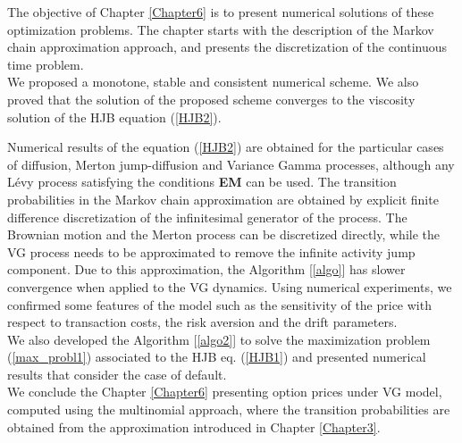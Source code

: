 The objective of Chapter \ref{Chapter6} is to present numerical solutions of these optimization problems. 
The chapter starts with the description of the Markov chain approximation approach, and presents the discretization of the continuous time problem.\\
We proposed a monotone, stable and consistent numerical scheme. We also proved that the solution of the proposed scheme converges to the viscosity solution of the
HJB equation (\ref{HJB2}).

Numerical results of the equation (\ref{HJB2}) are obtained for the particular cases of diffusion, Merton jump-diffusion and Variance Gamma processes, 
although any Lévy process satisfying the conditions \textbf{EM} can be used. 
The transition probabilities in the Markov chain approximation are obtained by explicit finite difference discretization of the 
infinitesimal generator of the process. 
The Brownian motion and the Merton process can be discretized directly, 
while the VG process needs to be approximated to remove the infinite activity jump component.
Due to this approximation, the Algorithm [\ref{algo}] has slower convergence when applied to the VG dynamics.
Using numerical experiments, we confirmed some features of the model such as the sensitivity of the price with respect to transaction costs, the risk aversion and the drift
parameters. \\
We also developed the Algorithm [\ref{algo2}] to solve the maximization problem (\ref{max_probl1}) associated to the HJB eq. (\ref{HJB1})
and presented numerical results that consider the case of default. \\
We conclude the Chapter \ref{Chapter6} presenting option prices under VG model, computed using the multinomial approach, 
where the transition probabilities are obtained
from the approximation introduced in Chapter \ref{Chapter3}. 




